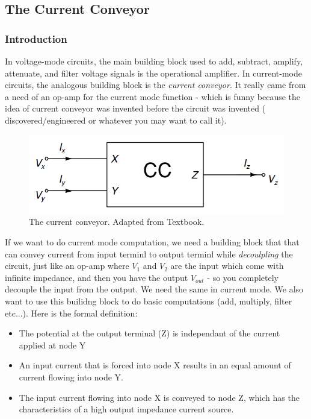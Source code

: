\subsection{The Current Conveyor}

\subsubsection{Introduction}

In voltage-mode circuits, the main building block used to add, subtract, amplify, attenuate, and filter voltage signals is the operational amplifier. In current-mode circuits, the analogous building block is the \textit{current conveyor}. It really came from a need of an op-amp for the current mode function - which is funny because the idea of current conveyor was invented before the circuit was invented ( discovered/engineered or whatever you may want to call it). 

\begin{figure}[H]
    \centering
    \includegraphics[width=0.8\linewidth]{../../Figures/Current_Conveyor.PNG}
    \caption{The current conveyor. Adapted from Textbook.}
    \label{fig:Current_Conveyor}
\end{figure}

If we want to do current mode computation, we need a building block that that can convey current from input terminl to output terminl while \textit{decoulpling} the circuit, just like an op-amp where $V_1$ and $V_2$ are the input which come with infinite impedance, and then you have the output $V_{out}$ - so you completely decouple the input from the output. We need the same in current mode. We also want to use this builidng block to do basic computations (add, multiply, filter etc...). Here is the formal definition: 

\begin{itemize}
    \item The potential at the output terminal (Z) is independant of the current applied at node Y
    \item An input current that is forced into node X results in an equal amount of current flowing into node Y.
    \item The input current flowing into node X is conveyed to node Z, which has the characteristics of a high output impedance current source.
\end{itemize}

